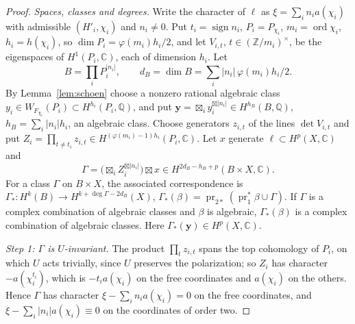 \documentclass[11pt]{amsart}
\theoremstyle{definition}
\theoremstyle{remark}
\newcommand{\Q}{\mathbb Q}
\newcommand{\Z}{\mathbb Z}
\newcommand{\C}{\mathbb C}
\begin{document}
\begin{proof}
\emph{Spaces, classes and degrees.} Write the character of $\ell$ as $\xi=\sum_in_ia(\chi_i)$ with admissible $(H'_i,\chi_i)$ and $n_i\ne0$. Put $t_i=\operatorname{sign}n_i$, $P_i=P_{\chi_i}$, $m_i=\operatorname{ord}\chi_i$, $h_i=h(\chi_i)$, so $\dim P_i=\varphi(m_i)h_i/2$, and let $V_{i,t}$, $t\in(\Z/m_i)^\times$, be the eigenspaces of $H^1(P_i,\C)$, each of dimension $h_i$. Let
\[
B=\textstyle\prod_iP_i^{|n_i|},\qquad d_B=\dim B=\sum_i|n_i|\,\varphi(m_i)h_i/2 .
\]
By Lemma~\ref{lem:schoen} choose a nonzero rational algebraic class $y_i\in W_{F_{\chi_i}}(P_i)\subset H^{h_i}(P_i,\Q)$, and put $\mathbf y=\boxtimes_iy_i^{\boxtimes|n_i|}\in H^{h_B}(B,\Q)$, $h_B=\sum_i|n_i|h_i$, an algebraic class. Choose generators $z_{i,t}$ of the lines $\det V_{i,t}$ and put $Z_i=\prod_{t\ne t_i}z_{i,t}\in H^{(\varphi(m_i)-1)h_i}(P_i,\C)$. Let $x$ generate $\ell\subset H^p(X,\C)$ and
\[
\Gamma=\Big(\textstyle\boxtimes_iZ_i^{\boxtimes|n_i|}\Big)\boxtimes x\in H^{2d_B-h_B+p}(B\times X,\C).
\]
For a class $\Gamma$ on $B\times X$, the associated correspondence is $\Gamma_*\colon H^k(B)\to H^{k+\deg\Gamma-2d_B}(X)$, $\Gamma_*(\beta)=\operatorname{pr}_{2*}(\operatorname{pr}_1^*\beta\cup\Gamma)$. If $\Gamma$ is a complex combination of algebraic classes and $\beta$ is algebraic, $\Gamma_*(\beta)$ is a complex combination of algebraic classes. Here $\Gamma_*(\mathbf y)\in H^p(X,\C)$.

\emph{Step 1: $\Gamma$ is $U$-invariant.} The product $\prod_tz_{i,t}$ spans the top cohomology of $P_i$, on which $U$ acts trivially, since $U$ preserves the polarization; so $Z_i$ has character $-a(\chi_i^{t_i})$, which is $-t_ia(\chi_i)$ on the free coordinates and $a(\chi_i)$ on the others. Hence $\Gamma$ has character $\xi-\sum_in_ia(\chi_i)=0$ on the free coordinates, and $\xi-\sum_i|n_i|a(\chi_i)\equiv0$ on the coordinates of order two.


\end{proof}
\end{document}
